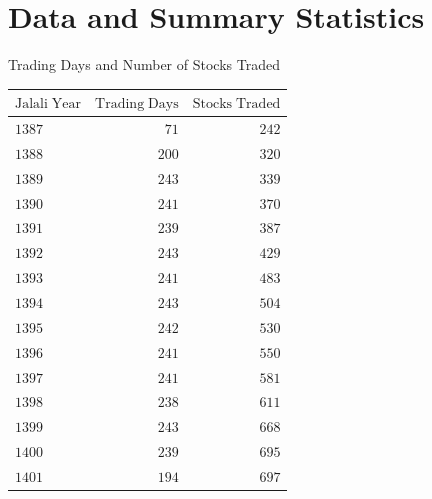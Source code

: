 \documentclass{beamer}
\begin{document}
\section{Data and Summary Statistics}

\begin{frame}{Trading Days and Number of Stocks Traded}
    \centering
    \fontsize{11}{13} \selectfont
    \begin{tabular}{lrr}
        \toprule
        \(\mathrm{Jalali \; Year}\) & \(\mathrm{Trading \; Days}\) & \(\mathrm{Stocks \; Traded}\) \\
        \midrule
        \(\mathrm{1387}\)           & \(\mathrm{71}\)              & \(\mathrm{242}\)              \\
        \(\mathrm{1388}\)           & \(\mathrm{200}\)             & \(\mathrm{320}\)              \\
        \(\mathrm{1389}\)           & \(\mathrm{243}\)             & \(\mathrm{339}\)              \\
        \(\mathrm{1390}\)           & \(\mathrm{241}\)             & \(\mathrm{370}\)              \\
        \(\mathrm{1391}\)           & \(\mathrm{239}\)             & \(\mathrm{387}\)              \\
        \(\mathrm{1392}\)           & \(\mathrm{243}\)             & \(\mathrm{429}\)              \\
        \(\mathrm{1393}\)           & \(\mathrm{241}\)             & \(\mathrm{483}\)              \\
        \(\mathrm{1394}\)           & \(\mathrm{243}\)             & \(\mathrm{504}\)              \\
        \(\mathrm{1395}\)           & \(\mathrm{242}\)             & \(\mathrm{530}\)              \\
        \(\mathrm{1396}\)           & \(\mathrm{241}\)             & \(\mathrm{550}\)              \\
        \(\mathrm{1397}\)           & \(\mathrm{241}\)             & \(\mathrm{581}\)              \\
        \(\mathrm{1398}\)           & \(\mathrm{238}\)             & \(\mathrm{611}\)              \\
        \(\mathrm{1399}\)           & \(\mathrm{243}\)             & \(\mathrm{668}\)              \\
        \(\mathrm{1400}\)           & \(\mathrm{239}\)             & \(\mathrm{695}\)              \\
        \(\mathrm{1401}\)           & \(\mathrm{194}\)             & \(\mathrm{697}\)              \\
        \bottomrule
    \end{tabular}
\end{frame}
\end{document}
